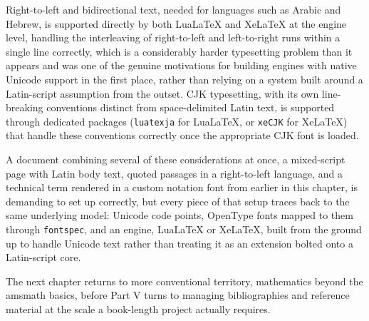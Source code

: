 Right-to-left and bidirectional text, needed for languages such as Arabic and Hebrew, is supported directly by both LuaLaTeX and XeLaTeX at the engine level, handling the interleaving of right-to-left and left-to-right runs within a single line correctly, which is a considerably harder typesetting problem than it appears and was one of the genuine motivations for building engines with native Unicode support in the first place, rather than relying on a system built around a Latin-script assumption from the outset. CJK typesetting, with its own line-breaking conventions distinct from space-delimited Latin text, is supported through dedicated packages (\texttt{luatexja} for LuaLaTeX, or \texttt{xeCJK} for XeLaTeX) that handle these conventions correctly once the appropriate CJK font is loaded.

A document combining several of these considerations at once, a mixed-script page with Latin body text, quoted passages in a right-to-left language, and a technical term rendered in a custom notation font from earlier in this chapter, is demanding to set up correctly, but every piece of that setup traces back to the same underlying model: Unicode code points, OpenType fonts mapped to them through \texttt{fontspec}, and an engine, LuaLaTeX or XeLaTeX, built from the ground up to handle Unicode text rather than treating it as an extension bolted onto a Latin-script core.

The next chapter returns to more conventional territory, mathematics beyond the amsmath basics, before Part V turns to managing bibliographies and reference material at the scale a book-length project actually requires.
